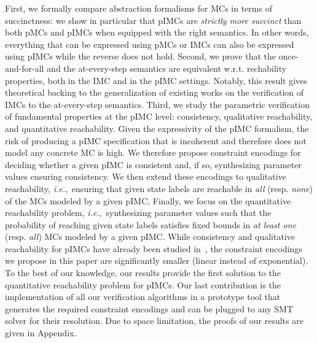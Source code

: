 \documentclass{llncs}
\newcommand{\dtmc}{\textnormal{MC}}
\newcommand{\imc}{\textnormal{IMC}}
\newcommand{\pimc}{\textnormal{pIMC}}
\newcommand{\pmc}{\textnormal{pMC}}
\newcommand{\ie} {{\em i.e.},\ }
\begin{document}
First, we formally compare abstraction formalisms for
{\dtmc}s in terms of succinctness: we show in particular that {\pimc}s
are {\em strictly more succinct} than both {\pmc}s and {\pimc}s when
equipped with the right semantics. In other words, everything that can
be expressed using {\pmc}s or {\imc}s can also be expressed using
{\pimc}s while the reverse does not hold. Second, we prove that the
once-and-for-all and the at-every-step semantics are equivalent w.r.t.
rechability properties, both in the {\imc} and in the {\pimc}
settings. Notably, this result gives theoretical backing to the
generalization of existing works on the verification of {\imc}s to the
at-every-step semantics.  Third, we study the parametric verification of
fundamental properties at the {\pimc} level: consistency, qualitative
reachability, and quantitative reachability. Given the expressivity of
the {\pimc} formalism, the risk of producing a {\pimc} specification
that is incoherent and therefore does not model any concrete {\dtmc}
is high. We therefore propose constraint encodings for deciding
whether a given {\pimc} is consistent and, if so, synthesizing
parameter values ensuring consistency. We then extend these encodings
to qualitative reachability, \ie ensuring that given state
labels are reachable in {\em all} (resp. {\em none}) of the {\dtmc}s
modeled by a given {\pimc}. Finally, we focus on the quantitative
reachability problem, \ie synthesizing parameter values such
that the probability of reaching given state labels satisfies fixed
bounds in {\em at least one} (resp. {\em all}) {\dtmc}s modeled by a
given {\pimc}. While consistency and qualitative reachability for
{\pimc}s have already been studied in~\cite{DelahayeLP16}, the
constraint encodings we propose in this paper are significantly
smaller (linear instead of exponential). To the best of our knowledge,
our results provide the first solution to the quantitative reachability problem for {\pimc}s.
Our last contribution is the implementation of all our verification algorithms in a prototype tool
that generates the required constraint encodings and can be plugged to
any SMT solver for their resolution.
Due to space limitation, the proofs of our results are given in Appendix.
\end{document}

